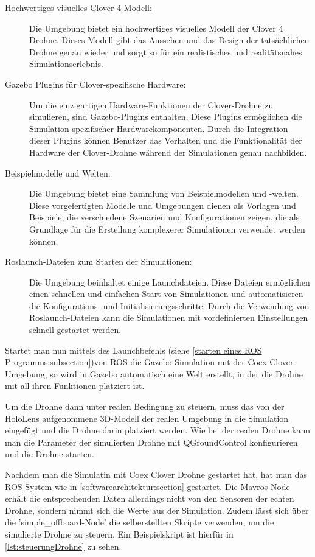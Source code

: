 \begin{description}
    \item[Hochwertiges visuelles Clover 4 Modell:] Die Umgebung bietet ein hochwertiges visuelles Modell der Clover 4 Drohne. Dieses Modell gibt das Aussehen und das Design der tatsächlichen Drohne genau wieder und sorgt so für ein realistisches und realitätsnahes Simulationserlebnis. 
    
    \item[Gazebo Plugins für Clover-spezifische Hardware:] Um die einzigartigen Hardware-Funktionen der Clover-Drohne zu simulieren, sind Gazebo-Plugins enthalten. Diese Plugins ermöglichen die Simulation spezifischer Hardwarekomponenten. Durch die Integration dieser Plugins können Benutzer das Verhalten und die Funktionalität der Hardware der Clover-Drohne während der Simulationen genau nachbilden.
    
    \item[Beispielmodelle und Welten:] Die Umgebung bietet eine Sammlung von Beispiel\-modellen und -welten. Diese vorgefertigten Modelle und Umgebungen dienen als Vorlagen und Beispiele, die verschiedene Szenarien und Konfigurationen zeigen, die als Grundlage für die Erstellung komplexerer Simulationen verwendet werden können.
    
    \item[Roslaunch-Dateien zum Starten der Simulationen:] Die Umgebung beinhaltet einige Launchdateien. Diese Dateien ermöglichen einen schnellen und einfachen Start von Simulationen und automatisieren die Konfigurations- und Initialisierungsschritte. Durch die Verwendung von Roslaunch-Dateien kann die Simulationen mit vordefinierten Einstellungen schnell gestartet werden.   
\end{description}

Startet man nun mittels des Launchbefehls (siehe \ref{starten eines ROS Programms:subsection})von \ac{ROS} die Gazebo-Simulation mit der Coex Clover Umgebung, so wird in Gazebo automatisch eine Welt erstellt, in der die Drohne mit all ihren Funktionen platziert ist.

Um die Drohne dann unter realen Bedingung zu steuern, muss das von der HoloLens aufgenommene 3D-Modell der realen Umgebung in die Simulation eingefügt und die Drohne darin platziert werden. Wie bei der realen Drohne kann man die Parameter der simulierten Drohne mit QGroundControl konfigurieren und die Drohne starten.

Nachdem man die Simulatin mit Coex Clover Drohne gestartet hat, hat man das \ac{ROS}-System wie in \ref{softwarearchitektur:section} gestartet.
Die Mavros-Node erhält die entsprechenden Daten allerdings nicht von den Sensoren der echten Drohne, sondern nimmt sich die Werte aus der Simulation. Zudem lässt sich über die 'simple\_offboard-Node' die selberstellten Skripte verwenden, um die simulierte Drohne zu steuern. Ein Beispielskript ist hierfür in \ref{lst:steuerungDrohne} zu sehen.

